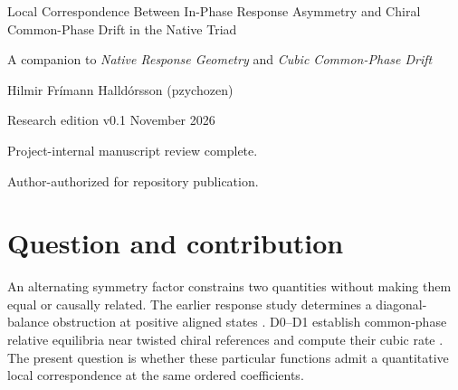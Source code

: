 \documentclass[11pt,a4paper]{article}
\numberwithin{equation}{section}
\theoremstyle{remark}\newtheorem{remark}[theorem]{Remark}
\begin{document}
\thispagestyle{plain}
{\LARGE\bfseries\raggedright Local Correspondence Between In-Phase Response Asymmetry and Chiral Common-Phase Drift in the Native Triad\par}
\vspace{6pt}
{\normalsize A companion to \emph{Native Response Geometry} and \emph{Cubic Common-Phase Drift}\par}
\vspace{7pt}
{\large Hilmir Fr\'imann Halld\'orsson (pzychozen)\par}
{\small Research edition v0.1  November 2026\par}
{\small\bfseries\raggedright Project-internal manuscript review complete.\par Author-authorized for repository publication.\par}
\begin{abstract}
Two established native-triad quantities contain an alternating factor in the channel coefficients: the cycle-product obstruction of an in-phase response matrix and the common-phase rate on a distinct chiral branch. We compare them at identical parameters, with $(\epsilon,g,\lambda)=h(1,1/6,1/30)$ and mean-zero weak coefficient heterogeneity. On one qualitative neighborhood valid for every $0\le h\le1/4$, the normalized response product and the selected positive-label chiral rate factor by the same oriented coefficient product with positive symmetric real-analytic quotients. Their complete local zero sets and signs therefore agree; the conjugate branch has the opposite rate. The quotient between these functions extends through equal coefficients, although only its leading value is explicitly evaluated. The response product has nonzero leading order $h^3$, whereas the per-update chiral advance has order $h$, at fixed sufficiently small pairwise-distinct coefficients. At $h=0$ these statements concern analytic generator extensions; the discrete map is the identity. A three-state comparison explains the limit: the assigned in-phase diagnostic does not select the realized signed advance without the actual state or branch. No attraction, physical-force law or calibrated spatial motion is inferred.
\end{abstract}

\section{Question and contribution}\label{sec:question}
An alternating symmetry factor constrains two quantities without making them equal or causally related. The earlier response study determines a diagonal-balance obstruction at positive aligned states \cite{nrg}. D0--D1 establish common-phase relative equilibria near twisted chiral references and compute their cubic rate \cite{drift,d0d1}. The present question is whether these particular functions admit a quantitative local correspondence at the same ordered coefficients.
\end{document}
